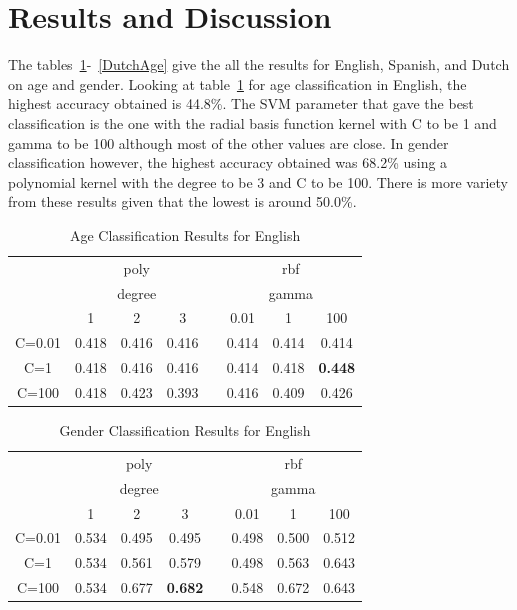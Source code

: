 \documentclass[conference]{IEEEtran}
\begin{document}
\section{Results and Discussion}
The tables~\ref{EnglishAge}-~\ref{DutchAge} give the all the results for English, Spanish, and Dutch on age and gender. Looking at table~\ref{EnglishAge} for age classification in English, the highest accuracy obtained is 44.8\%. The SVM parameter that gave the best classification is the one with the radial basis function kernel with C to be 1 and gamma to be 100 although most of the other values are close. In gender classification however, the highest accuracy obtained was 68.2\% using a polynomial kernel with the degree to be 3 and C to be 100. There is more variety from these results given that the lowest is around 50.0\%.
\begin{table}[!htbp]
\centering
\caption{Age Classification Results for English}
\label{EnglishAge}
\setlength{\tabcolsep}{0.5em}
{\renewcommand{\arraystretch}{1.2}%
\begin{tabular}{cccccccc}
\toprule
     & \multicolumn{3}{c}{poly}   &  & \multicolumn{3}{c}{rbf}        \\
     & \multicolumn{3}{c}{degree} &  & \multicolumn{3}{c}{gamma}      \\
    & 1       & 2       & 3      &  & 0.01  & 1     & 100            \\
\midrule
C=0.01 & 0.418   & 0.416   & 0.416  &  & 0.414 & 0.414 & 0.414          \\
C=1    & 0.418   & 0.416   & 0.416  &  & 0.414 & 0.418 & \textbf{0.448} \\
C=100  & 0.418   & 0.423   & 0.393  &  & 0.416 & 0.409 & 0.426         \\
\bottomrule 
\end{tabular}
}
\end{table}

\begin{table}[!htbp]
\centering
\caption{Gender Classification Results for English}
\label{EnglishGender}
\setlength{\tabcolsep}{0.5em}
{\renewcommand{\arraystretch}{1.2}%
\begin{tabular}{cccccccc}
\toprule
     & \multicolumn{3}{c}{poly}       &  & \multicolumn{3}{c}{rbf}   \\
     & \multicolumn{3}{c}{degree}     &  & \multicolumn{3}{c}{gamma} \\
    & 1     & 2     & 3              &  & 0.01    & 1       & 100   \\
\midrule
C=0.01 & 0.534 & 0.495 & 0.495          &  & 0.498   & 0.500   & 0.512 \\
C=1    & 0.534 & 0.561 & 0.579          &  & 0.498   & 0.563   & 0.643 \\
C=100  & 0.534 & 0.677 & \textbf{0.682} &  & 0.548   & 0.672   & 0.643 \\
\bottomrule
\end{tabular}
}
\end{table}
\end{document}
